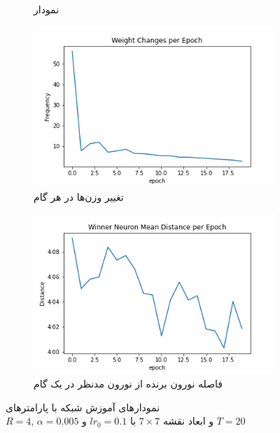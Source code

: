 \documentclass[12pt, a4paper]{article}
\begin{document}
\begin{figure}[h]
\begin{subfigure}{0.45\linewidth}
        \caption{نمودار }
    \end{subfigure}
    \newline
    \begin{subfigure}{0.45\linewidth}
        \includegraphics[width=\linewidth]{images/q5/r7/weight_change.png}
        \caption{تغییر وزن‌ها در هر گام}
    \end{subfigure}
    \hfill
    \begin{subfigure}{0.45\linewidth}
        \includegraphics[width=\linewidth]{images/q5/r7/winner_distance.png}
        \caption{فاصله نورون برنده از نورون مدنظر در یک گام}
    \end{subfigure}
    \caption{نمودار‌های آموزش شبکه  با پارامتر‌های \\$R=4$, $\alpha=0.005$ و ابعاد نقشه $7 \times 7$ با $lr_0=0.1$ و $T=20$}
    \label{r7}
\end{figure}
\end{document}
